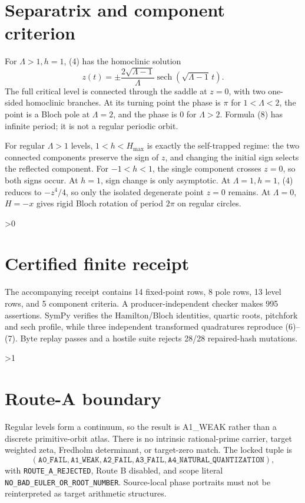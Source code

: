 \documentclass[10pt]{article}
\begin{document}
\section{Separatrix and component criterion}
For \(\Lambda>1,h=1\), (4) has the homoclinic solution
\[
 z(t)=\pm\frac{2\sqrt{\Lambda-1}}{\Lambda}
 \operatorname{sech}(\sqrt{\Lambda-1}\,t). \tag{8}
\]
The full critical level is connected through the saddle at \(z=0\), with two
one-sided homoclinic branches.  At its turning point the phase is \(\pi\) for
\(1<\Lambda<2\), the point is a Bloch pole at \(\Lambda=2\), and the phase is
0 for \(\Lambda>2\).  Formula (8) has infinite period; it is not a regular
periodic orbit.

For regular \(\Lambda>1\) levels, \(1<h<H_{\max}\) is exactly the
self-trapped regime: the two connected components preserve the sign of \(z\),
and changing the initial sign selects the reflected component.  For
\(-1<h<1\), the single component crosses \(z=0\), so both signs occur.  At
\(h=1\), sign change is only asymptotic.  At \(\Lambda=1,h=1\), (4) reduces
to \(-z^4/4\), so only the isolated degenerate point \(z=0\) remains.  At
\(\Lambda=0\), \(H=-x\) gives rigid Bloch rotation of period \(2\pi\) on
regular circles.

\ifnum\CRevisionRound>0
\section{Certified finite receipt}
The accompanying receipt contains 14 fixed-point rows, 8 pole rows, 13 level
rows, and 5 component criteria.  A producer-independent checker makes 995
assertions.  SymPy verifies the Hamilton/Bloch identities, quartic roots,
pitchfork and sech profile, while three independent transformed quadratures
reproduce (6)--(7).  Byte replay passes and a hostile suite rejects 28/28
repaired-hash mutations.
\fi

\ifnum\CRevisionRound>1
\section{Route-A boundary}
Regular levels form a continuum, so the result is A1\_WEAK rather than a
discrete primitive-orbit atlas.  There is no intrinsic rational-prime carrier,
target weighted zeta, Fredholm determinant, or target-zero match.  The locked
tuple is
\[
(\mathtt{A0\_FAIL},\mathtt{A1\_WEAK},\mathtt{A2\_FAIL},
 \mathtt{A3\_FAIL},\mathtt{A4\_NATURAL\_QUANTIZATION}),
\]
with \texttt{ROUTE\_A\_REJECTED}, Route B disabled, and scope literal
\texttt{NO\_BAD\_EULER\_OR\_ROOT\_NUMBER}.  Source-local phase portraits
must not be reinterpreted as target arithmetic structures.
\fi
\end{document}
